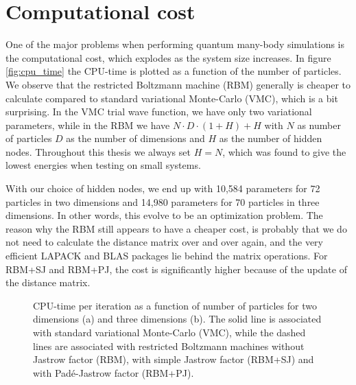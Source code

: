 \section{Computational cost}
One of the major problems when performing quantum many-body simulations is the computational cost, which explodes as the system size increases. In figure \eqref{fig:cpu_time} the CPU-time is plotted as a function of the number of particles. We observe that the restricted Boltzmann machine (RBM) generally is cheaper to calculate compared to standard variational Monte-Carlo (VMC), which is a bit surprising. In the VMC trial wave function, we have only two variational parameters, while in the RBM we have $N\cdot D\cdot (1+H)+H$ with $N$ as number of particles $D$ as the number of dimensions and $H$ as the number of hidden nodes. Throughout this thesis we always set $H=N$, which was found to give the lowest energies when testing on small systems. \cite{nordhagen_computational_2018} 

With our choice of hidden nodes, we end up with 10,584 parameters for 72 particles in two dimensions and 14,980 parameters for 70 particles in three dimensions. In other words, this evolve to be an optimization problem. The reason why the RBM still appears to have a cheaper cost, is probably that we do not need to calculate the distance matrix over and over again, and the very efficient LAPACK and BLAS packages lie behind the matrix operations. For RBM+SJ and RBM+PJ, the cost is significantly higher because of the update of the distance matrix.

\begin{figure}
	\centering 
	\subfloat[2D]{{}}
	\subfloat[3D]{{}}
	\caption{CPU-time per iteration as a function of number of particles for two dimensions (a) and three dimensions (b). The solid line is associated with standard variational Monte-Carlo (VMC), while the dashed lines are associated with restricted Boltzmann machines without Jastrow factor (RBM), with simple Jastrow factor (RBM+SJ) and with Padé-Jastrow factor (RBM+PJ).}
	\label{fig:cpu_time}
\end{figure} 

